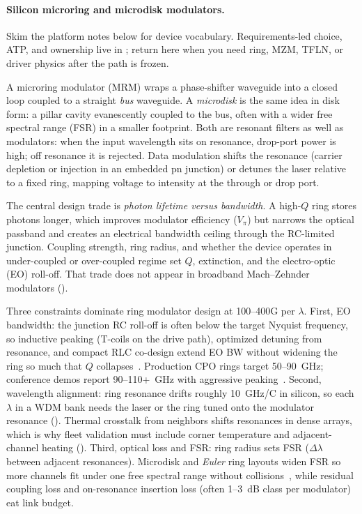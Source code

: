 \paragraph{Silicon microring and microdisk modulators.}
\label{sec:siring}

Skim the platform notes below for device vocabulary. Requirements-led choice,
ATP, and ownership live in ; return here when you need ring,
MZM, TFLN, or driver physics after the path is frozen.

A microring modulator (MRM) wraps a phase-shifter waveguide into a closed loop
coupled to a straight \emph{bus} waveguide. A \emph{microdisk} is the same idea in
disk form: a pillar cavity evanescently coupled to the bus, often with a wider free
spectral range (FSR) in a smaller footprint. Both are resonant filters as well as
modulators: when the input wavelength sits on resonance, drop-port power is high;
off resonance it is rejected. Data modulation shifts the resonance (carrier
depletion or injection in an embedded pn junction) or detunes the laser relative
to a fixed ring, mapping voltage to intensity at the through or drop port.

The central design trade is \emph{photon lifetime versus bandwidth}. A high-$Q$
ring stores photons longer, which improves modulator efficiency ($V_\pi$) but narrows
the optical passband and creates an electrical bandwidth ceiling through the
RC-limited junction. Coupling strength, ring radius, and whether the device
operates in under-coupled or over-coupled regime set $Q$, extinction, and the
electro-optic (EO) roll-off. That trade does not appear in broadband Mach--Zehnder
modulators ().

Three constraints dominate ring modulator design at 100--400G per $\lambda$.
First, EO bandwidth: the junction RC roll-off is often below the target Nyquist
frequency, so inductive peaking (T-coils on the drive path), optimized detuning
from resonance, and compact RLC co-design extend EO BW without widening the ring
so much that $Q$ collapses~. Production CPO rings
target 50--90~GHz; conference demos report 90--110+~GHz with aggressive
peaking~. Second, wavelength alignment: ring
resonance drifts roughly 10~GHz/\textdegree C in silicon, so each $\lambda$ in a
WDM bank needs the laser or the ring tuned onto the modulator resonance
(). Thermal crosstalk from neighbors shifts
resonances in dense arrays, which is why fleet validation must include corner
temperature and adjacent-channel heating
(). Third, optical loss and FSR: ring radius
sets FSR ($\Delta\lambda$ between adjacent resonances). Microdisk and
\emph{Euler} ring layouts widen FSR so more channels fit under one free spectral
range without collisions~, while residual coupling loss and
on-resonance insertion loss (often 1--3~dB class per modulator) eat link budget.

